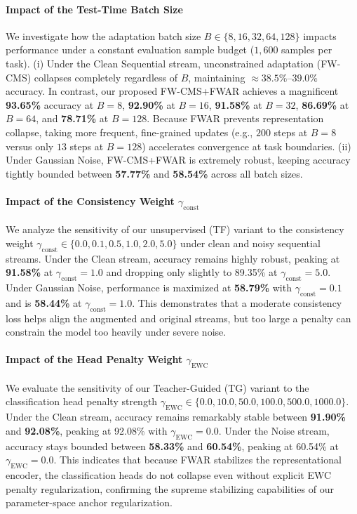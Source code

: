 \documentclass{article}
\begin{document}
\paragraph{Impact of the Test-Time Batch Size}
We investigate how the adaptation batch size $B \in \{8, 16, 32, 64, 128\}$ impacts performance under a constant evaluation sample budget ($1,600$ samples per task).
(i) Under the Clean Sequential stream, unconstrained adaptation (FW-CMS) collapses completely regardless of $B$, maintaining $\approx 38.5\%$--$39.0\%$ accuracy. In contrast, our proposed FW-CMS+FWAR achieves a magnificent \textbf{93.65\%} accuracy at $B=8$, \textbf{92.90\%} at $B=16$, \textbf{91.58\%} at $B=32$, \textbf{86.69\%} at $B=64$, and \textbf{78.71\%} at $B=128$. Because FWAR prevents representation collapse, taking more frequent, fine-grained updates (e.g., $200$ steps at $B=8$ versus only $13$ steps at $B=128$) accelerates convergence at task boundaries.
(ii) Under Gaussian Noise, FW-CMS+FWAR is extremely robust, keeping accuracy tightly bounded between \textbf{57.77\%} and \textbf{58.54\%} across all batch sizes.

\paragraph{Impact of the Consistency Weight $\gamma_{\text{const}}$}
We analyze the sensitivity of our unsupervised (TF) variant to the consistency weight $\gamma_{\text{const}} \in \{0.0, 0.1, 0.5, 1.0, 2.0, 5.0\}$ under clean and noisy sequential streams. Under the Clean stream, accuracy remains highly robust, peaking at \textbf{91.58\%} at $\gamma_{\text{const}} = 1.0$ and dropping only slightly to 89.35\% at $\gamma_{\text{const}} = 5.0$. Under Gaussian Noise, performance is maximized at \textbf{58.79\%} with $\gamma_{\text{const}} = 0.1$ and is \textbf{58.44\%} at $\gamma_{\text{const}} = 1.0$. This demonstrates that a moderate consistency loss helps align the augmented and original streams, but too large a penalty can constrain the model too heavily under severe noise.

\paragraph{Impact of the Head Penalty Weight $\gamma_{\text{EWC}}$}
We evaluate the sensitivity of our Teacher-Guided (TG) variant to the classification head penalty strength $\gamma_{\text{EWC}} \in \{0.0, 10.0, 50.0, 100.0, 500.0, 1000.0\}$. Under the Clean stream, accuracy remains remarkably stable between \textbf{91.90\%} and \textbf{92.08\%}, peaking at 92.08\% with $\gamma_{\text{EWC}} = 0.0$. Under the Noise stream, accuracy stays bounded between \textbf{58.33\%} and \textbf{60.54\%}, peaking at 60.54\% at $\gamma_{\text{EWC}} = 0.0$. This indicates that because FWAR stabilizes the representational encoder, the classification heads do not collapse even without explicit EWC penalty regularization, confirming the supreme stabilizing capabilities of our parameter-space anchor regularization.
\end{document}
